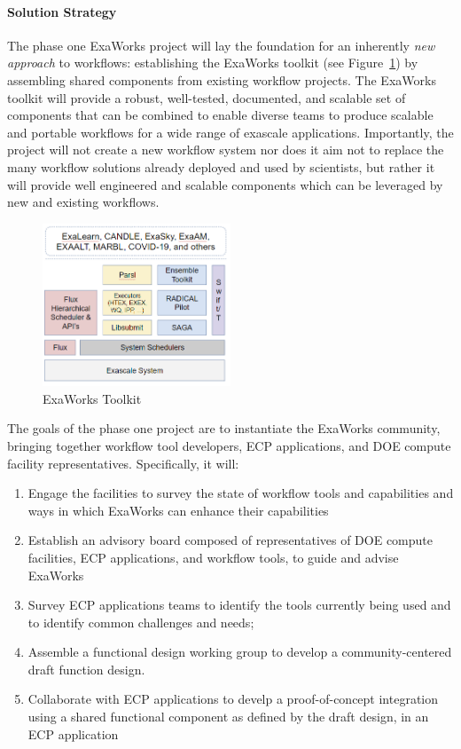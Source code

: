 \paragraph{Solution Strategy}
The phase one ExaWorks project will lay the foundation for an inherently
\textit{new approach} to workflows: establishing the ExaWorks toolkit (see
Figure~\ref{fig:arch}) by assembling shared components from existing workflow
projects. The ExaWorks toolkit will provide a robust, well-tested, documented,
and scalable set of components that can be combined to enable diverse teams to
produce scalable and portable workflows for a wide range of exascale
applications. Importantly, the project will not create a new workflow system
nor does it aim not to replace the many workflow solutions already deployed
and used by scientists, but rather it will provide well engineered and
scalable components which can be leveraged by new and existing workflows.


\begin{figure}
\begin{center}
    \includegraphics[width=0.5\textwidth]{projects/2.3.5-Ecosystem/2.3.5.10-ExaWorks/exaworks.png}
  \end{center}
  \caption{ExaWorks Toolkit\label{fig:arch}}
\end{figure} 

The goals of the phase one project are to instantiate the ExaWorks community, 
bringing together workflow tool developers, ECP applications, and DOE compute facility representatives.  Specifically, it will:
\begin{enumerate}
    \item Engage the facilities to survey the state of workflow tools and capabilities and ways in which ExaWorks can enhance their capabilities
    \item Establish an advisory board composed of representatives of DOE compute facilities, ECP applications, and workflow tools, to guide and advise ExaWorks
    \item Survey ECP applications teams to identify the tools currently being used and to identify common challenges and needs;
    \item Assemble a functional design working group to develop a community-centered draft function design.
    \item Collaborate with ECP applications to develp a proof-of-concept integration using a shared functional component as defined by the draft design, in an ECP application
\end{enumerate}

